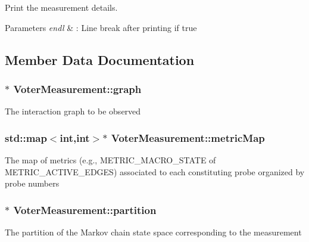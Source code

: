 Print the measurement details. 


\begin{DoxyParams}{Parameters}
{\em endl} & \+: Line break after printing if true \\
\hline
\end{DoxyParams}


\subsection{Member Data Documentation}
\hypertarget{class_voter_measurement_a8d22d4b78f7e2f4c747f5716c4885351}{}
\subsubsection[{graph}]{$\ast$ Voter\+Measurement\+::graph}\label{class_voter_measurement_a8d22d4b78f7e2f4c747f5716c4885351}
The interaction graph to be observed \hypertarget{class_voter_measurement_a316930ebb0b6623a37ca51598b0413d2}{}
\subsubsection[{metric\+Map}]{\setlength{\rightskip}{0pt plus 5cm}std\+::map$<$int,int$>$$\ast$ Voter\+Measurement\+::metric\+Map}\label{class_voter_measurement_a316930ebb0b6623a37ca51598b0413d2}
The map of metrics (e.\+g., M\+E\+T\+R\+I\+C\+\_\+\+M\+A\+C\+R\+O\+\_\+\+S\+T\+A\+T\+E of M\+E\+T\+R\+I\+C\+\_\+\+A\+C\+T\+I\+V\+E\+\_\+\+E\+D\+G\+E\+S) associated to each constituting probe organized by probe numbers \hypertarget{class_voter_measurement_aa3879b092c573e4ba4f45531a4f57e5b}{}
\subsubsection[{partition}]{$\ast$ Voter\+Measurement\+::partition}\label{class_voter_measurement_aa3879b092c573e4ba4f45531a4f57e5b}
The partition of the Markov chain state space corresponding to the measurement \hypertarget{class_voter_measurement_abdee5af4a48de3334ace791912033e28}{}
